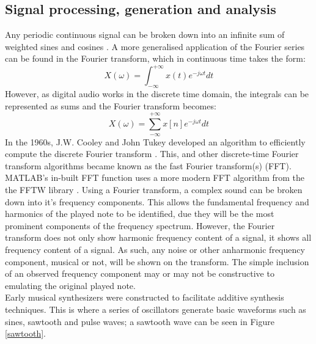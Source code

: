 \documentclass{article}
\begin{document}
    \subsection{Signal processing, generation and analysis}
        Any periodic continuous signal can be broken down into an infinite sum of weighted sines and cosines \cite{weisstein2004fourier}.
        A more generalised application of the Fourier series can be found in the Fourier transform, which in continuous time takes the form:
        \begin{equation}
            X(\omega) = \int_{-\infty}^{+\infty}x(t)e^{-j\omega t}dt
        \end{equation}
        However, as digital audio works in the discrete time domain, the integrals can be represented as sums and the Fourier transform becomes:
        \begin{equation}
            X(\omega) = \sum_{-\infty}^{+\infty}x[n]e^{-j\omega t}dt
        \end{equation}
        In the 1960s, J.W. Cooley and John Tukey developed an algorithm to efficiently compute the discrete Fourier transform \cite{cooley1965algorithm}.
        This, and other discrete-time Fourier transform algorithms became known as the fast Fourier transform(s) (FFT).
        MATLAB's in-built FFT function uses a more modern FFT algorithm from the the FFTW library \cite{frigo1998fftw}.
        Using a Fourier transform, a complex sound can be broken down into it's frequency components.
        This allows the fundamental frequency and harmonics of the played note to be identified, due they will be the most prominent components of the frequency spectrum.
        However, the Fourier transform does not only show harmonic frequency content of a signal, it shows all frequency content of a signal.
        As such, any noise or other anharmonic frequency component, musical or not, will be shown on the transform.
        The simple inclusion of an observed frequency component may or may not be constructive to emulating the original played note.
        \\
        Early musical synthesizers were constructed to facilitate additive synthesis techniques.
        This is where a series of oscillators generate basic waveforms such as sines, sawtooth and pulse waves; a sawtooth wave can be seen in Figure \ref{sawtooth}.
\end{document}
